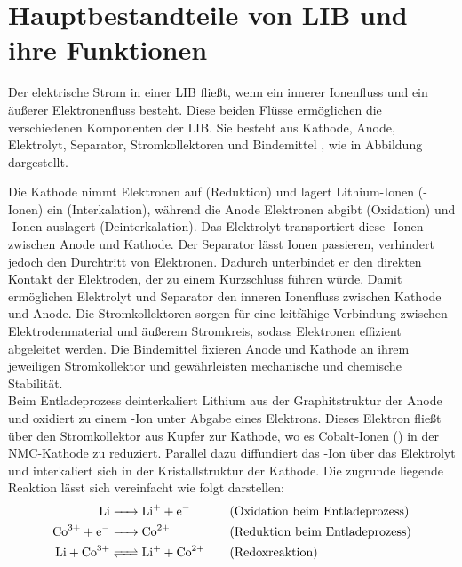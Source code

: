 \section{Hauptbestandteile von \acs{LIB} und ihre Funktionen}
Der elektrische Strom in einer \acs{LIB} fließt, wenn ein innerer Ionenfluss und ein äußerer Elektronenfluss besteht. Diese beiden Flüsse ermöglichen die verschiedenen Komponenten der \acs{LIB}. Sie besteht aus Kathode, Anode, Elektrolyt, Separator, Stromkollektoren und Bindemittel \cite{urlIdAufbauBatterie}, wie in Abbildung dargestellt. 


Die Kathode nimmt Elektronen auf (Reduktion) und lagert Lithium-Ionen (-Ionen) ein (Interkalation), während die Anode Elektronen abgibt (Oxidation) und -Ionen auslagert (Deinterkalation). Das Elektrolyt transportiert diese -Ionen zwischen Anode und Kathode. Der Separator lässt Ionen passieren, verhindert jedoch den Durchtritt von Elektronen. Dadurch unterbindet er den direkten Kontakt der Elektroden, der zu einem Kurzschluss führen würde. Damit ermöglichen Elektrolyt und Separator den inneren Ionenfluss zwischen Kathode und Anode. Die Stromkollektoren sorgen für eine leitfähige Verbindung zwischen Elektrodenmaterial und äußerem Stromkreis, sodass Elektronen effizient abgeleitet werden. Die Bindemittel fixieren Anode und Kathode an ihrem jeweiligen Stromkollektor und gewährleisten mechanische und chemische Stabilität.\\
Beim Entladeprozess deinterkaliert Lithium aus der Graphitstruktur der Anode und oxidiert zu einem -Ion unter Abgabe eines Elektrons. Dieses Elektron fließt über den Stromkollektor aus Kupfer zur Kathode, wo es Cobalt-Ionen () in der \acs{NMC}-Kathode zu  reduziert. Parallel dazu diffundiert das -Ion über das Elektrolyt und interkaliert sich in der Kristallstruktur der Kathode. Die zugrunde liegende Reaktion lässt sich vereinfacht wie folgt darstellen:
\begin{align*}
    \ce{Li &-> Li+ + e-}              &\quad& \text{(Oxidation beim Entladeprozess)} \\
    \ce{Co^{3+} + e- &-> Co^{2+}}     &\quad& \text{(Reduktion beim Entladeprozess)} \\
    \ce{Li + Co^{3+} &<=> Li^+ + Co^{2+}} &\quad& \text{(Redoxreaktion)}
\end{align*}

